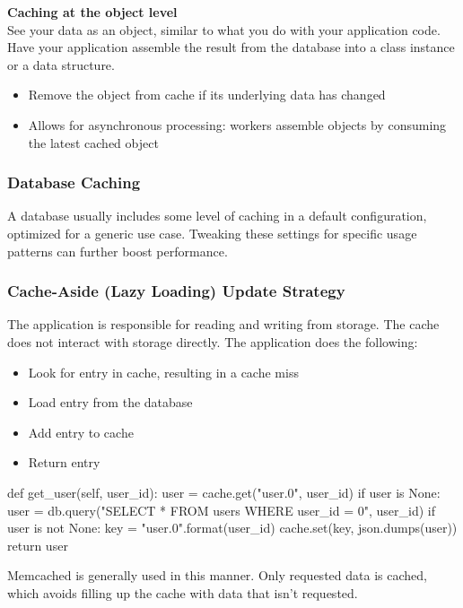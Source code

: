 \documentclass[12pt, titlepage]{article}
\begin{document}
\textbf{Caching at the object level} \\
See your data as an object, similar to what you do with your application code. Have your application assemble the result from the database into a class instance or a data structure.

\begin{itemize}
  \item Remove the object from cache if its underlying data has changed
  \item Allows for asynchronous processing: workers assemble objects by consuming the latest cached object
\end{itemize}

\subsubsection{Database Caching}

A database usually includes some level of caching in a default configuration, optimized for a generic use case. Tweaking these settings for specific usage patterns can further boost performance.

\subsubsection{Cache-Aside (Lazy Loading) Update Strategy}

The application is responsible for reading and writing from storage. The cache does not interact with storage directly. The application does the following:

\begin{itemize}
  \item Look for entry in cache, resulting in a cache miss
  \item Load entry from the database
  \item Add entry to cache
  \item Return entry
\end{itemize}

\begin{python}
def get_user(self, user_id):
    user = cache.get("user.{0}", user_id)
    if user is None:
        user = db.query("SELECT * FROM users WHERE user_id = {0}", user_id)
        if user is not None:
            key = "user.{0}".format(user_id)
            cache.set(key, json.dumps(user))
    return user
\end{python}

Memcached is generally used in this manner. Only requested data is cached, which avoids filling up the cache with data that isn't requested. \\
\end{document}
